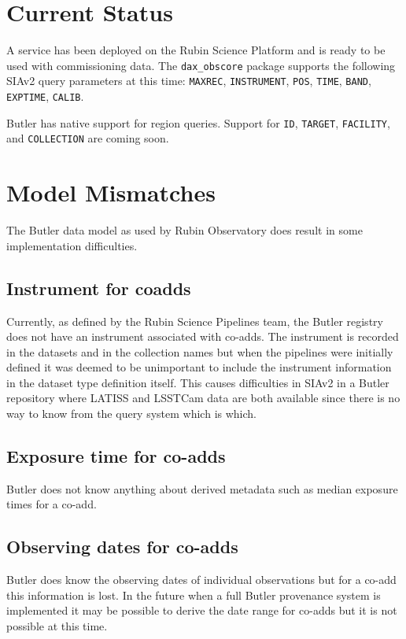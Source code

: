 \documentclass[11pt,twoside]{article}
\begin{document}
\section{Current Status}

A service has been deployed on the Rubin Science Platform and is ready to be used with commissioning data.
The \texttt{dax\_obscore} package supports the following SIAv2 query parameters at this time:
\texttt{MAXREC},
\texttt{INSTRUMENT},
\texttt{POS},
\texttt{TIME},
\texttt{BAND},
\texttt{EXPTIME},
\texttt{CALIB}.

Butler has native support for region queries.
Support for
\texttt{ID},
\texttt{TARGET},
\texttt{FACILITY},
and \texttt{COLLECTION} are coming soon.

\section{Model Mismatches}

The Butler data model as used by Rubin Observatory does result in some implementation difficulties.

\subsection{Instrument for coadds}

Currently, as defined by the Rubin Science Pipelines team, the Butler registry does not have an instrument associated with co-adds. The instrument is recorded in the datasets and in the collection names but when the pipelines were initially defined it was deemed to be unimportant to include the instrument information in the dataset type definition itself. This causes difficulties in SIAv2 in a Butler repository where LATISS and LSSTCam data are both available since there is no way to know from the query system which is which.

\subsection{Exposure time for co-adds}

Butler does not know anything about derived metadata such as median exposure times for a co-add.

\subsection{Observing dates for co-adds}

Butler does know the observing dates of individual observations but for a co-add this information is lost. In the future when a full Butler provenance system is implemented it may be possible to derive the date range for co-adds but it is not possible at this time.
\end{document}
